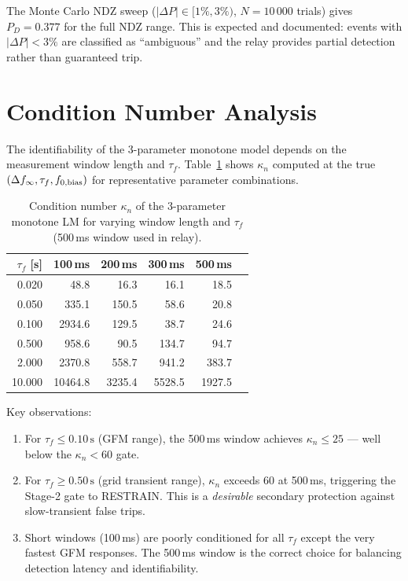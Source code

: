 \documentclass[11pt, a4paper]{article}
\newcommand{\kn}{\kappa_n}
\begin{document}
The Monte Carlo NDZ sweep ($|\Delta P| \in [1\%, 3\%)$, $N = 10\,000$ trials)
gives $P_D = 0.377$ for the full NDZ range.  This is expected and documented:
events with $|\Delta P| < 3\%$ are classified as ``ambiguous'' and the relay
provides partial detection rather than guaranteed trip.


\section{Condition Number Analysis}
\label{sec:kappa}

The identifiability of the 3-parameter monotone model depends on the
measurement window length and $\tau_f$.  Table~\ref{tab:kappa} shows $\kn$
computed at the true $(\Delta f_\infty, \tau_f, f_{0,\rm bias})$ for
representative parameter combinations.

\begin{table}[h]
\centering
\caption{Condition number $\kn$ of the 3-parameter monotone LM for varying
         window length and $\tau_f$ (500\,ms window used in relay).}
\label{tab:kappa}
\begin{tabular}{rrrrrr}
\toprule
$\tau_f$ [s] & 100\,ms & 200\,ms & 300\,ms & 500\,ms \\
\midrule
 0.020 &  48.8 &  16.3 &  16.1 &  18.5 \\
 0.050 & 335.1 & 150.5 &  58.6 &  20.8 \\
 0.100 &2934.6 & 129.5 &  38.7 &  24.6 \\
 0.500 & 958.6 &  90.5 & 134.7 &  94.7 \\
 2.000 &2370.8 & 558.7 & 941.2 & 383.7 \\
10.000 &10464.8&3235.4 &5528.5 &1927.5 \\
\bottomrule
\end{tabular}
\end{table}

Key observations:
\begin{enumerate}
  \item For $\tau_f \leq 0.10\,\text{s}$ (GFM range), the 500\,ms window
    achieves $\kn \leq 25$ — well below the $\kn < 60$ gate.
  \item For $\tau_f \geq 0.50\,\text{s}$ (grid transient range), $\kn$
    exceeds 60 at 500\,ms, triggering the Stage-2 gate to RESTRAIN.  This is
    a \emph{desirable} secondary protection against slow-transient false trips.
  \item Short windows (100\,ms) are poorly conditioned for all $\tau_f$
    except the very fastest GFM responses.  The 500\,ms window is the correct
    choice for balancing detection latency and identifiability.
\end{enumerate}
\end{document}

